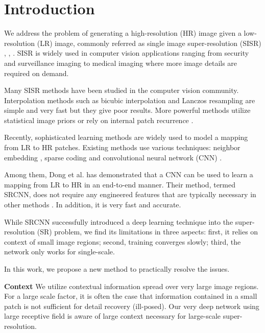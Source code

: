\documentclass[10pt,twocolumn,letterpaper]{article}
\begin{document}
\section{Introduction}
We address the problem of generating a high-resolution (HR) image given a low-resolution (LR) image, commonly referred as single image super-resolution (SISR) \cite{Irani1991}, \cite{freeman2000learning}, \cite{glasner2009super}. SISR is widely used in computer vision applications ranging from security and surveillance imaging to medical imaging where more image details are required on demand.

Many SISR methods have been studied in the computer vision community. Interpolation methods such as bicubic interpolation and Lanczos resampling \cite{duchon1979lanczos} are simple and very fast but they give poor results. More powerful methods utilize statistical image priors \cite{sun2008image,Kim2010} or rely on internal patch recurrence \cite{glasner2009super}.

Recently, sophisticated learning methods are widely used to model a mapping from LR to HR patches. Existing methods use various techniques: neighbor embedding \cite{chang2004super,bevilacqua2012}, sparse coding \cite{yang2010image,zeyde2012single,Timofte2013,Timofte} and convolutional neural network (CNN) \cite{Dong2014}.

Among them, Dong et al. \cite{Dong2014} has demonstrated that a CNN can be used to learn a mapping from LR to HR in an end-to-end manner. Their method, termed SRCNN, does not require any engineered features that are typically necessary in other methods \cite{yang2010image,zeyde2012single,Timofte2013,Timofte}. In addition, it is very fast and accurate.

While SRCNN successfully introduced a deep learning technique into the super-resolution (SR) problem, we find its limitations in three aspects: first, it relies on context of small image regions; second, training converges slowly; third, the network only works for single-scale.

In this work, we propose a new method to practically resolve the issues.


\textbf{Context} We utilize contextual information spread over very large image regions. For a large scale factor, it is often the case that information contained in a small patch is not sufficient for detail recovery (ill-posed). Our very deep network using large receptive field is aware of large context necessary for large-scale super-resolution.
\end{document}
